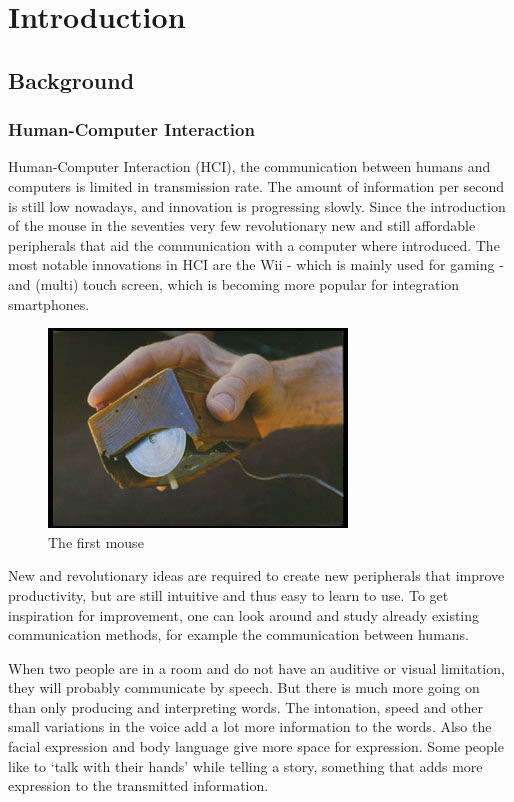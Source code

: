 
\chapter{Introduction}
\label{ch:intro}

\section{Background}
\subsection*{Human-Computer Interaction}
Human-Computer Interaction (HCI), the communication between humans and computers is limited in transmission rate. The amount of information per second is still low nowadays, and innovation is progressing slowly. Since the introduction of the mouse in the seventies very few revolutionary new and still affordable peripherals that aid the communication with a computer where introduced. The most notable innovations in HCI are the Wii - which is mainly used for gaming - and (multi) touch screen, which is becoming more popular for integration smartphones.

\begin{figure}[tb]
	\center{}
	\label{fig:mouse}
	\includegraphics[width=0.3\linewidth]{figures/mouse.jpg}
	\caption{The first mouse}
\end{figure}

New and revolutionary ideas are required to create new peripherals that improve productivity, but are still intuitive and thus easy to learn to use. To get inspiration for improvement, one can look around and study already existing communication methods, for example the communication between humans. 

When two people are in a room and do not have an auditive or visual limitation, they will probably communicate by speech. But there is much more going on than only producing and interpreting words. The intonation, speed and other small variations in the voice add a lot more information to the words. Also the facial expression and body language give more space for expression. Some people like to `talk with their hands' while telling a story, something that adds more expression to the transmitted information.

